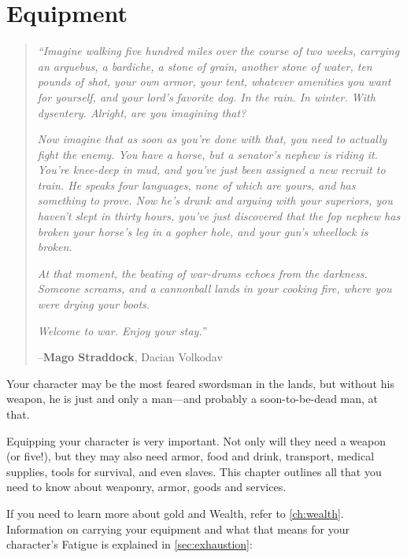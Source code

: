 \documentclass[oneside,11pt,english]{book}
\begin{document}
\chapter{Equipment}\label{ch:equipment}
\startcontents[chapters]
\clearpage
\begin{quotation}
	\emph{“Imagine walking five hundred miles over the course of two weeks, carrying an arquebus, a bardiche, a stone of grain, another stone of water, ten pounds of shot, your own armor, your tent, whatever amenities you want for yourself, and your lord’s favorite dog. In the rain. In winter. With dysentery. Alright, are you imagining that?}

	\emph{Now imagine that as soon as you’re done with that, you need to actually fight the enemy. You have a horse, but a senator’s nephew is riding it. You’re knee-deep in mud, and you’ve just been assigned a new recruit to train. He speaks four languages, none of which are yours, and has something to prove. Now he’s drunk and arguing with your superiors, you haven’t slept in thirty hours, you’ve just discovered that the fop nephew has broken your horse’s leg in a gopher hole, and your gun’s wheellock is broken.}

	\emph{At that moment, the beating of war-drums echoes from the darkness. Someone screams, and a cannonball lands in your cooking fire, where you were drying your boots.}
		
	\emph{Welcome to war. Enjoy your stay.”}

		\hfill--\textbf{Mago Straddock}, Dacian Volkodav
\end{quotation}
Your character may be the most feared swordsman in the lands, but without his weapon, he is just and 
only a man—and probably a soon-to-be-dead man, at that. 

Equipping your character is very important. Not only will they need a weapon (or five!), but they may 
also need armor, food and drink, transport, medical supplies, tools for survival, and even slaves. This 
chapter outlines all that you need to know about weaponry, armor, goods and services.

If you need to learn more about gold and Wealth, refer to \autoref{ch:wealth}. Information on carrying your equipment and what that means for your character’s Fatigue is explained in \autoref{sec:exhaustion}:~
\end{document}
